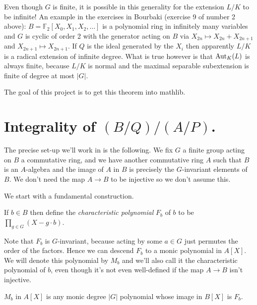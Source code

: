 Even though $G$ is finite, it is possible in this generality for the extension $L/K$ to be infinite!
An example in the exercises in Bourbaki (exercise 9 of number 2 above):
$B=\mathbb{F}_2[X_0,X_1,X_2,\ldots]$
is a polynomial ring in infinitely many variables and $G$ is cyclic of order 2 with
the generator acting on $B$ via $X_{2n}\mapsto X_{2n}+X_{2n+1}$ and $X_{2n+1}\mapsto X_{2n+1}$.
If $Q$ is the ideal generated by the $X_i$ then apparently $L/K$ is a radical extension of
infinite degree. What is true however is that $\operatorname{Aut}_K(L)$ is always finite, because
$L/K$ is normal and the maximal separable subextension is finite of degree at most $|G|$.

The goal of this project is to get this theorem into mathlib.

\section{Integrality of $(B/Q)/(A/P)$.}

The precise set-up we'll work in is the following. We fix $G$ a finite group acting
on $B$ a commutative ring, and we have another commutative ring $A$ such
that $B$ is an $A$-algebra and the image of $A$ in $B$ is precisely the $G$-invariant
elements of $B$. We don't need the map $A\to B$ to be injective so we don't assume this.

We start with a fundamental construction.

\begin{definition}
  \label{MulSemiringAction.CharacteristicPolynomial.F}
  \leanok
  If $b\in B$ then define the \emph{characteristic polynomial}
  $F_b$ of $b$ to be $\prod_{g\in G}(X-g\cdot b)$.
\end{definition}

Note that $F_b$ is $G$-invariant, because acting by some $a\in G$
just permutes the order of the factors. Hence we can descend $F_b$
to a monic polynomial in $A[X]$. We will denote this polynomial by $M_b$
and we'll also call it the characteristic polynomial of $b$, even though
it's not even well-defined if the map $A\to B$ isn't injective.

\begin{definition}
  \label{MulSemiringAction.CharacteristicPolynomial.M}
  \leanok
  $M_b$ in $A[X]$ is any monic degree $|G|$ polynomial whose
  image in $B[X]$ is $F_b$.
\end{definition}

